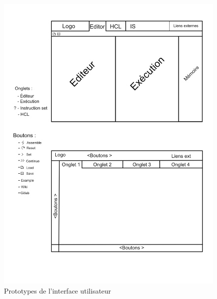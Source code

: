 \documentclass[french]{article}
\begin{document}
\newpage
\begin{figure}
    \centering
    \includegraphics[scale=0.35]{img/croquis_interface.jpg}
    \caption{Prototypes de l'interface utilisateur}
    \label{fig:my_label}
\end{figure}
\end{document}
